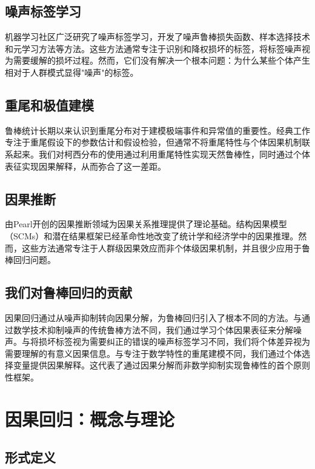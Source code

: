 \documentclass[conference]{IEEEtran}
\begin{document}
\begin{CJK}{UTF8}{gbsn}
\subsection{噪声标签学习}
机器学习社区广泛研究了噪声标签学习\cite{natarajan2013learning}，开发了噪声鲁棒损失函数、样本选择技术和元学习方法等方法\cite{han2018co}。这些方法通常专注于识别和降权损坏的标签，将标签噪声视为需要缓解的损坏过程。然而，它们没有解决一个根本问题：为什么某些个体产生相对于人群模式显得"噪声"的标签。

\subsection{重尾和极值建模}
鲁棒统计长期以来认识到重尾分布对于建模极端事件和异常值的重要性。经典工作专注于重尾假设下的参数估计和假设检验，但通常不将重尾特性与个体因果机制联系起来。我们对柯西分布的使用通过利用重尾特性实现天然鲁棒性，同时通过个体表征实现因果解释，从而弥合了这一差距。

\subsection{因果推断}
由Pearl\cite{pearl2009causality}开创的因果推断领域为因果关系推理提供了理论基础。结构因果模型（SCMs）\cite{spirtes2000causation}和潜在结果框架\cite{imbens2015causal}已经革命性地改变了统计学和经济学中的因果推理。然而，这些方法通常专注于人群级因果效应而非个体级因果机制，并且很少应用于鲁棒回归问题。

\subsection{我们对鲁棒回归的贡献}
因果回归通过从噪声抑制转向因果分解，为鲁棒回归引入了根本不同的方法。与通过数学技术抑制噪声的传统鲁棒方法不同，我们通过学习个体因果表征来分解噪声。与将损坏标签视为需要纠正的错误的噪声标签学习不同，我们将个体差异视为需要理解的有意义因果信息。与专注于数学特性的重尾建模不同，我们通过个体选择变量提供因果解释。这代表了通过因果分解而非数学抑制实现鲁棒性的首个原则性框架。

\section{因果回归：概念与理论}
\label{sec:concept}

\subsection{形式定义}


\end{CJK}
\end{document}
